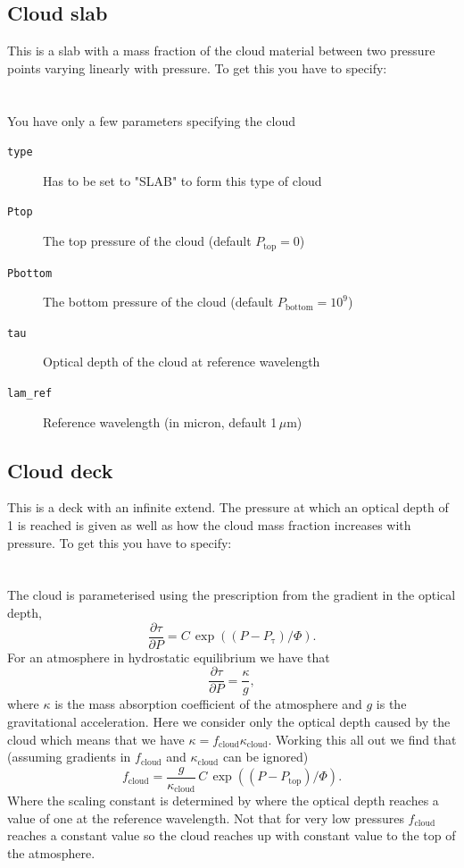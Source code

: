 \documentclass[12pt]{article}
\begin{document}
\subsection{Cloud slab}

This is a slab with a mass fraction of the cloud material between two pressure points varying linearly with pressure. To get this you have to specify:
\\
\\
\\
You have only a few parameters specifying the cloud

\begin{description}
\item[\texttt{type}]
Has to be set to "SLAB" to form this type of cloud
\item[\texttt{Ptop}]
The top pressure of the cloud (default $P_\mathrm{top}=0$)
\item[\texttt{Pbottom}]
The bottom pressure of the cloud (default $P_\mathrm{bottom}=10^9$)
\item[\texttt{tau}]
Optical depth of the cloud at reference wavelength
\item[\texttt{lam\_ref}]
Reference wavelength (in micron, default 1\,$\mu$m)
\end{description}

\subsection{Cloud deck}

This is a deck with an infinite extend. The pressure at which an optical depth of 1 is reached is given as well as how the cloud mass fraction increases with pressure. To get this you have to specify:
\\
\\
\\
The cloud is parameterised using the prescription from the gradient in the optical depth,
\begin{equation}
\frac{\partial \tau}{\partial P}=C\,\exp{((P-P_\mathrm{\tau})/\Phi)}.
\end{equation}
For an atmosphere in hydrostatic equilibrium we have that
\begin{equation}
\frac{\partial \tau}{\partial P}=\frac{\kappa}{g},
\end{equation}
where $\kappa$ is the mass absorption coefficient of the atmosphere and $g$ is the gravitational acceleration. Here we consider only the optical depth caused by the cloud which means that we have $\kappa=f_\mathrm{cloud}\kappa_\mathrm{cloud}$. Working this all out we find that (assuming gradients in $f_\mathrm{cloud}$ and $\kappa_\mathrm{cloud}$ can be ignored)
\begin{equation}
f_\mathrm{cloud}=\frac{g}{\kappa_\mathrm{cloud}}\,C\,\exp{((P-P_\mathrm{top})/\Phi)}.
\end{equation}
Where the scaling constant is determined by where the optical depth reaches a value of one at the reference wavelength. Not that for very low pressures $f_\mathrm{cloud}$ reaches a constant value so the cloud reaches up with constant value to the top of the atmosphere.
\end{document}
